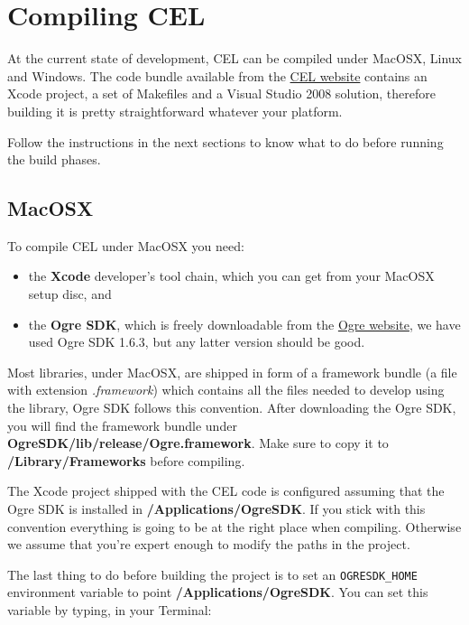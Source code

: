 \section{Compiling CEL} \label{build}

	At the current state of development, CEL can be compiled under MacOSX, Linux and Windows. The code bundle available from the
	\href{http://www.cameracontrol.org/language}{CEL website} contains an Xcode project, a set of Makefiles and a Visual Studio 
	2008 solution, therefore building it is pretty straightforward whatever your platform. 
	
	Follow the instructions in the next sections to know what to do before running the build phases.
	
	\subsection{MacOSX}
		
		To compile CEL under MacOSX you need:
	
		\begin{itemize}
			\setlength{\itemsep}{2pt}
			\setlength{\parskip}{0pt}
			\setlength{\parsep}{0pt}
			
			\item the \textbf{Xcode} developer's tool chain, which you can get from your MacOSX setup disc, and
			\item the \textbf{Ogre SDK}, which is freely downloadable from the \href{http://www.ogre3d.org}{Ogre website}, we have used
			Ogre SDK 1.6.3, but any latter version should be good.
		\end{itemize}
		
		\noindent
		Most libraries, under MacOSX, are shipped in form of a framework bundle (a file with extension \emph{.framework}) which contains 
		all the files needed to develop using the library, Ogre SDK follows this convention.
		After downloading the Ogre SDK, you will find the framework bundle under \textbf{OgreSDK/lib/release/Ogre.framework}. Make
		sure to copy it to \textbf{/Library/Frameworks} before compiling.
		
		The Xcode project shipped with the CEL code is configured assuming that the Ogre SDK is installed in \textbf{/Applications/OgreSDK}. 
		If you stick with this convention everything is going to be at the right place when compiling. Otherwise we assume that you're
		expert enough to modify the paths in the project.
		
		The last thing to do before building the project is to set an \texttt{OGRESDK\_HOME} environment variable to point
		\textbf{/Applications/OgreSDK}. You can set this variable by typing, in your Terminal:
		
